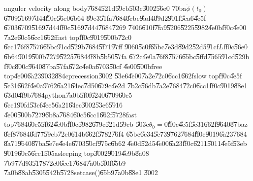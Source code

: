 \documentclass[12pt,a4paper]{article}
\begin{document}
anguler velocity along body\U{7684}\U{521d}\U{59cb}\U{503c}\U{3002}\U{56e0}%
\U{70ba}$\dot{\phi}(t_{0})$\U{6709}\U{5169}\U{7d44}\U{ff0c}\U{56e0}\U{6b64}%
\U{89e3}\U{51fa}\U{7684}\U{8cbc}\U{9ad4}\U{89d2}\U{901f}\U{5ea6}\U{4e5f}%
\U{6703}\U{6709}\U{5169}\U{7d44}\U{ff0c}\U{5169}\U{7d44}\U{7684}\U{7269}%
\U{7406}\U{610f}\U{7fa9}\U{5206}\U{5225}\U{5982}\U{4e0b}\U{ff0c}\U{4e00}%
\U{7a2e}\U{60c5}\U{6cc1}\U{662f}fast top\U{ff0c}\U{9019}\U{500b}\U{72c0}%
\U{6cc1}\U{76f8}\U{7576}\U{65bc}\U{91cd}\U{529b}\U{7684}\U{5f71}\U{97ff}%
\U{9060}\U{5c0f}\U{65bc}\U{7e3d}\U{89d2}\U{52d5}\U{91cf}$L$\U{ff0c}\U{56e0}%
\U{6b64}\U{9019}\U{500b}\U{7279}\U{5225}\U{7684}\U{4f8b}\U{5b50}\U{57fa}%
\U{672c}\U{4e0a}\U{76f8}\U{7576}\U{65bc}\U{5ffd}\U{7565}\U{91cd}\U{529b}%
\U{ff0c}\U{800c}\U{9640}\U{87ba}\U{57fa}\U{672c}\U{4e0a}\U{6703}\U{50cf}%
\U{4e00}\U{500b}free top\U{4e00}\U{6a23}\U{9032}\U{884c}precession\U{3002}%
\U{53e6}\U{4e00}\U{7a2e}\U{72c0}\U{6cc1}\U{662f}slow top\U{ff0c}\U{4e5f}%
\U{5c31}\U{662f}\U{4e0a}\U{9762}\U{6a21}\U{64ec}\U{7d50}\U{679c}\U{4e2d}%
\U{7b2c}\U{56db}\U{7a2e}\U{7684}\U{72c0}\U{6cc1}\U{ff0c}\U{9019}\U{88e1}%
\U{63d0}\U{4f9b}\U{7684}python\U{7a0b}\U{5f0f}\U{6240}\U{6709}\U{60c5}%
\U{6cc1}\U{90fd}\U{53ef}\U{4ee5}\U{6a21}\U{64ec}\U{3002}\U{53e6}\U{5916}%
\U{4e00}\U{500b}\U{7279}\U{6b8a}\U{7684}\U{60c5}\U{6cc1}\U{662f}\U{5728}fast
top\U{7684}\U{60c5}\U{5f62}\U{4e0b}\U{ff0c}\U{5982}\U{679c}\U{521d}\U{59cb}%
\U{503c}$\theta _{0}=0$\U{ff0c}\U{4e5f}\U{5c31}\U{662f}\U{9640}\U{87ba}z%
\U{8ef8}\U{7684}\U{8d77}\U{59cb}\U{72c0}\U{614b}\U{662f}\U{5782}\U{76f4}%
\U{65bc}\U{6c34}\U{5e73}\U{9762}\U{7684}\U{ff0c}\U{9019}\U{6a23}\U{7684}%
\U{8a71}\U{9640}\U{87ba}\U{5e7e}\U{4e4e}\U{6703}\U{50cf}\U{975c}\U{6b62}%
\U{4e0d}\U{52d5}\U{4e00}\U{6a23}\U{ff0c}\U{6211}\U{5011}\U{4e5f}\U{53eb}%
\U{9019}\U{60c5}\U{6cc1}\U{505a}sleeping top\U{3002}\U{9019}\U{4e9b}\U{8a08}%
\U{7b97}\U{7d93}\U{5178}\U{72c0}\U{6cc1}\U{7684}\U{7a0b}\U{5f0f}\U{65b9}%
\U{7a0b}\U{88ab}\U{5305}\U{542b}\U{5728}setcase()\U{65b9}\U{7a0b}\U{88e1}%
\U{3002}

\setcounter{page}{1}
\end{document}
